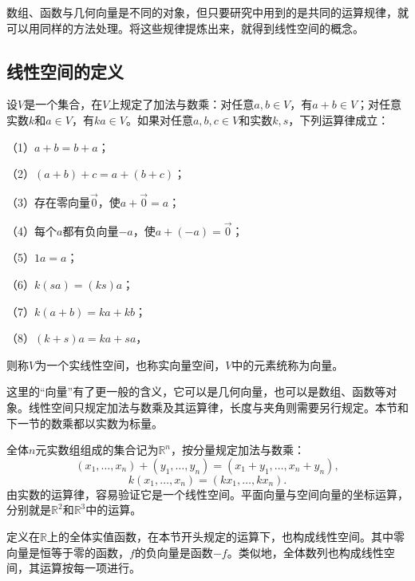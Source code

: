 数组、函数与几何向量是不同的对象，但只要研究中用到的是共同的运算规律，就可以用同样的方法处理。将这些规律提炼出来，就得到线性空间的概念。

\subsection{线性空间的定义}
\begin{definition}\label{def:linspace}
设\(V\)是一个集合，在\(V\)上规定了加法与数乘：对任意\(a , b \in V\)，有\(a + b \in V\)；对任意实数\(k\)和\(a \in V\)，有\(k a \in V\)。如果对任意\(a , b , c \in V\)和实数\(k , s\)，下列运算律成立：

（1）\(a + b = b + a\)；

（2）\(\left( a + b \right) + c = a + \left( b + c \right)\)；

（3）存在零向量\(\vec{0}\)，使\(a + \vec{0} = a\)；

（4）每个\(a\)都有负向量\(- a\)，使\(a + \left( - a \right) = \vec{0}\)；

（5）\(1 a = a\)；

（6）\(k \left( s a \right) = \left( k s \right) a\)；

（7）\(k \left( a + b \right) = k a + k b\)；

（8）\(\left( k + s \right) a = k a + s a\)，

则称\(V\)为一个实线性空间，也称实向量空间，\(V\)中的元素统称为向量。
\end{definition}

这里的“向量”有了更一般的含义，它可以是几何向量，也可以是数组、函数等对象。线性空间只规定加法与数乘及其运算律，长度与夹角则需要另行规定。本节和下一节的数乘都以实数为标量。

全体\(n\)元实数组组成的集合记为\(\mathbb{R}^{n}\)，按分量规定加法与数乘：
\begin{equation}
    \left( x_{1} , \ldots , x_{n} \right) + \left( y_{1} , \ldots , y_{n} \right) = \left( x_{1} + y_{1} , \ldots , x_{n} + y_{n} \right) ,
\end{equation}
\begin{equation}
    k \left( x_{1} , \ldots , x_{n} \right) = \left( k x_{1} , \ldots , k x_{n} \right) .
\end{equation}
由实数的运算律，容易验证它是一个线性空间。平面向量与空间向量的坐标运算，分别就是\(\mathbb{R}^{2}\)和\(\mathbb{R}^{3}\)中的运算。

定义在\(\mathbb{R}\)上的全体实值函数，在本节开头规定的运算下，也构成线性空间。其中零向量是恒等于零的函数，\(f\)的负向量是函数\(- f\)。类似地，全体数列也构成线性空间，其运算按每一项进行。

